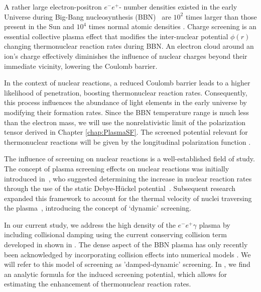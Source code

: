 A rather large electron-positron $e^-e^+$- number densities existed in the early Universe during Big-Bang nucleosynthesis (BBN)~\cite{Wang:2010px,Hwang:2021kno,Rafelski:2023emw} are $10^2$ times larger than those present in the Sun \cite{Bahcall:2001smc} and $10^4$ times normal atomic densities \cite{Grayson:2023flr}. Charge screening is an essential collective plasma effect that modifies the inter-nuclear potential $\phi(r)$ changing thermonuclear reaction rates during BBN. An electron cloud around an ion's charge effectively diminishes the influence of nuclear charges beyond their immediate vicinity, lowering the Coulomb barrier. 

In the context of nuclear reactions, a reduced Coulomb barrier leads to a higher likelihood of penetration, boosting thermonuclear reaction rates. Consequently, this process influences the abundance of light elements in the early universe by modifying their formation rates. Since the BBN temperature range is much less than the electron mass, we will use the nonrelativistic limit of the polarization tensor derived in Chapter \ref{chap:PlasmaSF}. The screened potential relevant for thermonuclear reactions will be given by the longitudinal polarization function .

The influence of screening on nuclear reactions is a well-established field of study. The concept of plasma screening effects on nuclear reactions was initially introduced in~\cite{Salpeter:1954nc}, who suggested determining the increase in nuclear reaction rates through the use of the static Debye-H{\"u}ckel potential~\cite{Debye:1923,Salpeter:1969apj,Famiano:2016hhs}. Subsequent research expanded this framework to account for the thermal velocity of nuclei traversing the plasma~\cite{Hwang:2021kno,Carraro:1988apj,Gruzinov:1997as,Opher:1999jh,Yao:2016cjs}, introducing the concept of `dynamic' screening. 

In our current study, we address the high density of the $e^-e^+\gamma$ plasma by including collisional damping using the current conserving collision term developed in \cite{Formanek:2021blc} shown in . The dense aspect of the BBN plasma has only recently been acknowledged by incorporating collision effects into numerical models \cite{Sasankan:2019oee,Kedia:2020xdc}. We will refer to this model of screening as 'damped-dynamic' screening. In \cite{Grayson:2023flr}, we find an analytic formula for the induced screening potential, which allows for estimating the enhancement of thermonuclear reaction rates.

